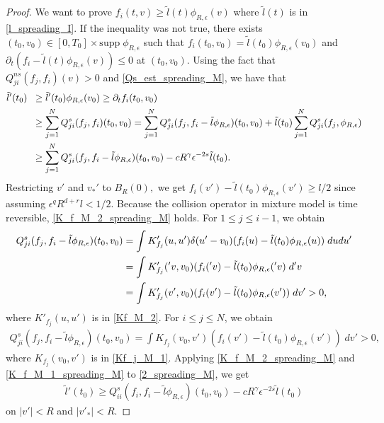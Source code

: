 \documentclass[reqno,10pt]{amsart}
\numberwithin{equation}{section}
\begin{document}
\begin{proof}
\noindent We want to prove $f_i(t,v)\geq \tilde{l}(t)\phi_{R,\epsilon}(v)$ where $\tilde{l}(t)$ is in \eqref{l_spreading_I}. If the inequality was not true, there exists $(t_0,v_0)\in [0,T_0]\times \mbox{supp}\;\phi_{R,\epsilon}$ such that $f_i(t_0,v_0)=\tilde{l}(t_0)\phi_{R,\epsilon}(v_0)$ and $\partial_t(f_i-\tilde{l}(t)\phi_{R,\epsilon}(v))\leq 0$ at $(t_0,v_0).$ Using the fact that $Q^{ns}_{ji}(f_j,f_i)(v)>0$ and  \eqref{Qs_est_spreading_M}, we have that
\begin{align}
    \tilde{l}'(t_0) \;\; &\geq \tilde{l}'(t_0)\phi_{R,\epsilon}(v_0) \geq \partial_t f_i(t_0,v_0) \notag \\
     &\geq \sum_{j=1}^{N} Q_{ji}^{s}(f_j,f_i) (t_0,v_0)
     = \sum_{j=1}^{N} Q_{ji}^{s}(f_j,f_i-\tilde{l}\phi_{R,\epsilon}) (t_0,v_0)
    +\tilde{l}(t_0)\sum_{j=1}^{N} Q_{ji}^{s}(f_j,\phi_{R,\epsilon}) \notag \\
    &\geq \sum_{j=1}^{N} Q_{ji}^{s}(f_j,f_i-\tilde{l}\phi_{R,\epsilon}) (t_0,v_0)- cR^{\gamma}\epsilon^{-2s}\tilde{l}(t_0)   \label{2_spreading_M}. 
\end{align} 
\noindent Restricting $v'$ and $v_*'$ to $B_R(0),$ we get $f_i(v')-\tilde{l}(t_0)\phi_{R,\epsilon}(v') \geq l/2$ since assuming $\epsilon^{q}R^{d+r}l < 1/2$. Because the collision operator in mixture model is time reversible, \eqref{K_f_M_2_spreading_M} holds. For $1 \leq j \leq i-1$, we obtain  
\begin{align} \label{K_f_M_2_spreading_M}
    Q_{ji}^{s}(f_j,f_i-\tilde{l}\phi_{R,\epsilon})(t_0,v_0) &= \int K'_{f_j}(u,u')\delta(u'-v_0)(f_i(u)-\tilde{l}(t_0)\phi_{R,\epsilon}(u)) \;dudu' \notag \\
    &= \int K'_{f_j}('v,v_0)(f_i('v)-\tilde{l}(t_0)\phi_{R,\epsilon}('v) \;d'v \notag \\
    &= \int K'_{f_j}(v',v_0)(f_i(v')-\tilde{l}(t_0)\phi_{R,\epsilon}(v')) \;dv' >0,
\end{align} where $K'_{f_j}(u,u')$ is in \eqref{Kf_M_2}.  For $i \leq j \leq N$, we obtain 
\begin{align} \label{K_f_M_1_spreading_M}
    Q_{ji}^{s}(f_j,f_i-\tilde{l}\phi_{R,\epsilon})(t_0,v_0)=\int K_{f_j}(v_0,v')(f_i(v')-\tilde{l}(t_0)\phi_{R,\epsilon}(v'))\; dv' > 0,
\end{align}  where $K_{f_j}(v_0,v')$ is in \eqref{Kf_j_M_1}. 
Applying \eqref{K_f_M_2_spreading_M} and \eqref{K_f_M_1_spreading_M} to \eqref{2_spreading_M}, we get 
\begin{align}
     \tilde{l}'(t_0) \geq Q^{s}_{ii}(f_i, f_i-\tilde{l}\phi_{R,\epsilon}) (t_0,v_0) - cR^{\gamma}\epsilon^{-2s}\tilde{l}(t_0) \label{4_spreading_M}
\end{align} on $|v'|<R$ and $|v'_*|<R$.  \vspace{3mm}


\end{proof}
\end{document}
